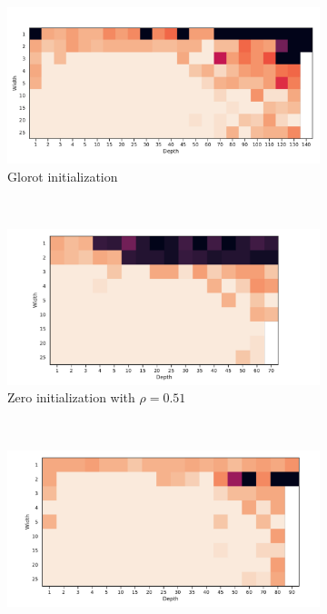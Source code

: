 \begin{figure}[h!]
  \centering
  \begin{subfigure}[b]{0.2\textwidth}
        \includegraphics[width=\textwidth]{img/moons_grid/acc-sep-up-0-0001.pdf}
        \caption{Glorot initialization}
        \label{fig:moons_glorot_rho}
    \end{subfigure}
    ~ %
      \centering
    \begin{subfigure}[b]{0.2\textwidth}
        \includegraphics[width=\textwidth]{img/moons_grid/acc-sep-up-0-0001-zero.pdf}
        \caption{Zero initialization with $\rho = 0.51$}
        \label{fig:moons_zeros_rho}
    \end{subfigure}
    ~ %
    \centering
    \begin{subfigure}[b]{0.2\textwidth}
        \includegraphics[width=\textwidth]{img/moons_grid/acc-sep-up-0-0001-nm-0.pdf}

\end{subfigure}
\end{figure}
